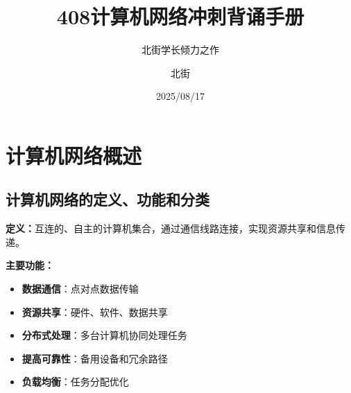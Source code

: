 \documentclass[lang=cn,newtx,10pt,scheme=chinese]{../../elegantbook}
\title{408计算机网络冲刺背诵手册}
\subtitle{北街学长倾力之作}
\author{北街}
\date{2025/08/17}
\begin{document}
\maketitle
\frontmatter

\tableofcontents

\mainmatter


\chapter{计算机网络概述}

\section{计算机网络的定义、功能和分类}

\textbf{定义：}互连的、自主的计算机集合，通过通信线路连接，实现资源共享和信息传递。

\textbf{主要功能：}
\begin{itemize}
  \item \textbf{数据通信}：点对点数据传输
  \item \textbf{资源共享}：硬件、软件、数据共享
  \item \textbf{分布式处理}：多台计算机协同处理任务
  \item \textbf{提高可靠性}：备用设备和冗余路径
  \item \textbf{负载均衡}：任务分配优化
\end{itemize}
\end{document}
